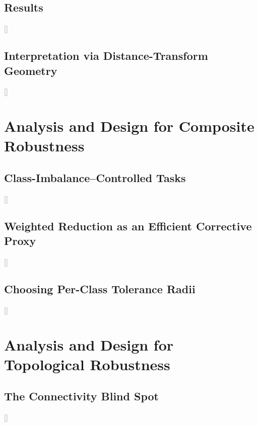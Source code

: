 \documentclass[sigconf]{acmart}
\newcommand{\tbd}[1]{\textcolor{gray}{[#1]}}
\begin{document}
\begin{table}
  \caption{Synthetic sensitivity sweeps.}
  \label{tab:sweeps}
\end{table}

\subsection{Results}
\label{subsec:motivation-results}
\tbd{}

\subsection{Interpretation via Distance-Transform Geometry}
\label{subsec:motivation-interpretation}
\tbd{}

\section{Analysis and Design for Composite Robustness}
\label{sec:composite}

\subsection{Class-Imbalance--Controlled Tasks}
\label{subsec:class-imbalance}
\tbd{}

\subsection{Weighted Reduction as an Efficient Corrective Proxy}
\label{subsec:weighted-reduction}
\tbd{}

\subsection{Choosing Per-Class Tolerance Radii}
\label{subsec:tolerance-radii}
\tbd{}

\section{Analysis and Design for Topological Robustness}
\label{sec:topological}

\subsection{The Connectivity Blind Spot}
\label{subsec:blindspot}
\tbd{}
\end{document}
